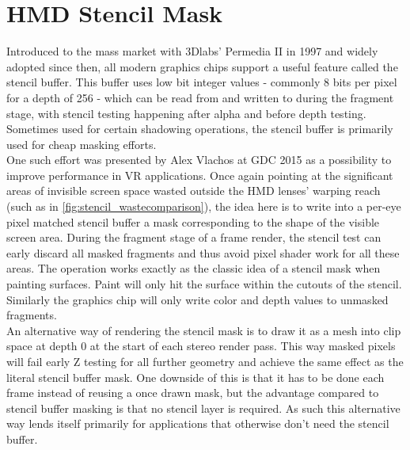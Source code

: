 
\section{HMD Stencil Mask} \label{stencilmask}
Introduced to the mass market with 3Dlabs' Permedia II in 1997 and widely adopted since then, all modern graphics chips support a  useful feature called the stencil buffer. This buffer uses low bit integer values - commonly 8 bits per pixel for a depth of 256 \cite{deVries.2014} - which can be read from and written to during the fragment stage, with stencil testing happening after alpha and before depth testing. Sometimes used for certain shadowing operations, the stencil buffer is primarily used for cheap masking efforts. \\
One such effort was presented by Alex Vlachos at GDC 2015 \cite{Vlachos.2015} as a possibility to improve performance in \gls{VR} applications. Once again pointing at the significant areas of invisible screen space wasted outside the HMD lenses' warping reach (such as in \autoref{fig:stencil_wastecomparison}), the idea here is to write into a per-eye pixel matched stencil buffer a mask corresponding to the shape of the visible screen area. During the fragment stage of a frame render, the stencil test can early discard all masked fragments and thus avoid pixel shader work for all these areas. The operation works exactly as the classic idea of a stencil mask when painting surfaces. Paint will only hit the surface within the cutouts of the stencil. Similarly the graphics chip will only write color and depth values to unmasked fragments. \\
An alternative way of rendering the stencil mask is to draw it as a mesh into clip space at depth 0 at the start of each stereo render pass. This way masked pixels will fail early Z testing for all further geometry and achieve the same effect as the literal stencil buffer mask. One downside of this is that it has to be done each frame instead of reusing a once drawn mask, but the advantage compared to stencil buffer masking is that no stencil layer is required. As such this alternative way lends itself primarily for applications that otherwise don't need the stencil buffer. 

